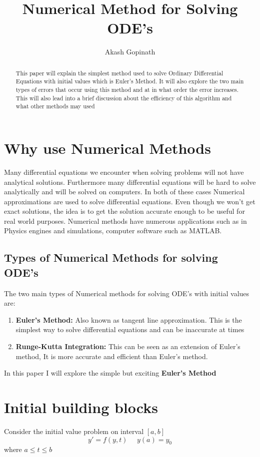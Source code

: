 \documentclass[11pt,a4paper]{amsart}
\author{Akash Gopinath}
\title{Numerical Method for Solving ODE's}
\begin{document}
	
	\begin{abstract}
		This paper will explain the simplest method used to solve Ordinary Differential Equations with initial values which is Euler's Method. It will also explore the two main types of errors that occur using this method and at in what order the error increases. This will also lead into a brief discussion about the efficiency of this algorithm and what other methods may used
	\end{abstract}
	
	\maketitle
\vspace{-20px}
	\section{Why use Numerical Methods}
	Many differential equations we encounter when solving problems will not have analytical solutions. Furthermore many differential equations will be hard to solve analytically and will be solved on computers. In both of these cases Numerical approximations are used to solve differential equations. Even though we won't get exact solutions, the idea is to get the solution accurate enough to be useful for real world purposes. Numerical methods have numerous applications such as in Physics engines and simulations, computer software such as MATLAB.
	
	\subsection{Types of Numerical Methods for solving ODE's}
	The two main types of Numerical methods \cite{polking,boyce} for solving ODE's with initial values are:
	\begin{enumerate}
		\item {\bf Euler's Method:} Also known as tangent line approximation. This is the simplest way to solve differential equations and can be inaccurate at times
		\item {\bf Runge-Kutta Integration:} This can be seen as an extension of Euler's method, It is more accurate and efficient than Euler's method.
	\end{enumerate}
	In this paper I will explore the simple but exciting {\bf Euler's Method}
	
	\section{Initial building blocks}
	Consider the initial value problem on interval $[a,b]$
	$$y' = f(y,t) \ \ \ \ \ \ y(a) = y_0$$
	where $a \leq t \leq b$
	
\end{document}
